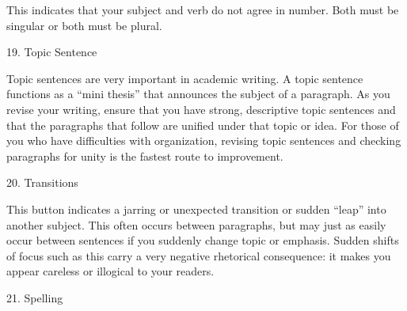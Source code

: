 This indicates that your subject and verb do not agree in number. Both must be
singular or both must be plural.

 \begin{center}
\bigskip

{\huge 19. Topic Sentence} \end{center}

Topic sentences are very important in academic writing. A topic sentence
functions as a “mini thesis” that announces the subject of a paragraph. As you
revise your writing, ensure that you have strong, descriptive topic sentences
and that the paragraphs that follow are unified under that topic or idea. For
those of you who have difficulties with organization, revising topic sentences
and checking paragraphs for unity is the fastest route to improvement.

 \begin{center}
\bigskip

{\huge 20. Transitions} \end{center}

This button indicates a jarring or unexpected transition or sudden “leap” into
another subject. This often occurs between paragraphs, but may just as easily
occur between sentences if you suddenly change topic or emphasis. Sudden shifts
of focus such as this carry a very negative rhetorical consequence: it makes you
appear careless or illogical to your readers.

 \begin{center}
\bigskip

{\huge 21. Spelling} \end{center}

